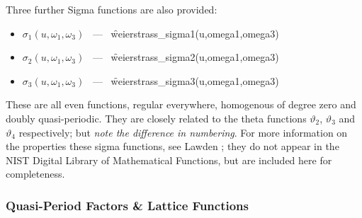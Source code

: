 Three further Sigma functions are also provided:
\begin{itemize}
\item $\sigma_1(u, \omega_1, \omega_3)$ \ --- \ \f{weierstrass\_sigma1(u,omega1,omega3)}
\item $\sigma_2(u, \omega_1, \omega_3)$ \ --- \ \f{weierstrass\_sigma2(u,omega1,omega3)}
\item $\sigma_3(u, \omega_1, \omega_3)$ \ --- \ \f{weierstrass\_sigma3(u,omega1,omega3)}
\end{itemize}
These are all even functions, regular everywhere, homogenous of degree zero and doubly quasi-periodic. They are closely related to the
theta functions $\vartheta_2$, $\vartheta_3$ and $\vartheta_4$ respectively; but \emph{note the difference in numbering}.
For more information on the properties these sigma functions, see Lawden \cite{Lawden:89};
they do not appear in the NIST Digital Library of Mathematical Functions, but are included here for completeness.

\subsubsection{ Quasi-Period Factors \& Lattice Functions}
\hypertarget{ETA}{}
\hypertarget{operator:LATTICE_E1}{}
\hypertarget{operator:LATTICE_E2}{}
\hypertarget{operator:LATTICE_E3}{}
\hypertarget{operator:LATTICE_G}{}
\hypertarget{operator:LATTICE_DELTA}{}
\hypertarget{operator:LATTICE_G2}{}
\hypertarget{operator:LATTICE_G3}{}

